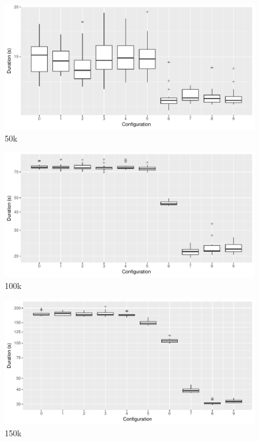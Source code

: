 \begin{figure}[h]
        \includegraphics[width=\textwidth,keepaspectratio]{gfx/mean-durations-50k.pdf}
        \caption{50k}
        \label{fig:evaluation:performance:mean-durations-50k}
\end{figure}

\begin{figure}[h]
        \includegraphics[width=\textwidth,keepaspectratio]{gfx/mean-durations-100k.pdf}
        \caption{100k}
        \label{fig:evaluation:performance:mean-durations-100k}
\end{figure}

\begin{figure}[h]
        \includegraphics[width=\textwidth,keepaspectratio]{gfx/mean-durations-150k.pdf}
        \caption{150k}
        \label{fig:evaluation:performance:mean-durations-150k}
\end{figure}

